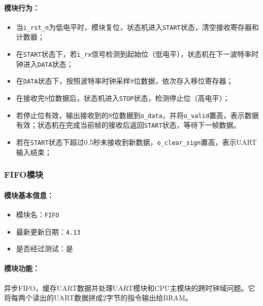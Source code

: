 \documentclass[lang=cn,a4paper,newtx]{elegantpaper}
\begin{document}
\paragraph{模块行为：}
\begin{itemize}
  \item 当\texttt{i\_rst\_n}为低电平时，模块复位，状态机进入\texttt{START}状态，清空接收寄存器和计数器；
  \item 在\texttt{START}状态下，若\texttt{i\_rx}信号检测到起始位（低电平），状态机在下一波特率时钟进入\texttt{DATA}状态；
  \item 在\texttt{DATA}状态下，按照波特率时钟采样8位数据，依次存入移位寄存器；
  \item 在接收完8位数据后，状态机进入\texttt{STOP}状态，检测停止位（高电平）；
  \item 若停止位有效，输出接收到的8位数据到\texttt{o\_data}，并将\texttt{o\_valid}置高，表示数据有效；状态机在完成当前帧的接收后返回\texttt{START}状态，等待下一帧数据。
  \item 若在\texttt{START}状态下超过0.5秒未接收到新数据，\texttt{o\_clear\_sign}置高，表示UART输入结束；
\end{itemize}
\subsubsection{FIFO模块}
\paragraph{模块基本信息：}
\begin{itemize}
  \item 模块名：\texttt{FIFO}
  \item 最新更新日期：\texttt{4.13}
  \item 是否经过测试：是
\end{itemize}
\paragraph{模块功能：}
异步FIFO，缓存UART数据并处理UART模块和CPU主模块的跨时钟域问题。它将每两个读出的UART数据拼成2字节的指令输出给BRAM。
\end{document}
